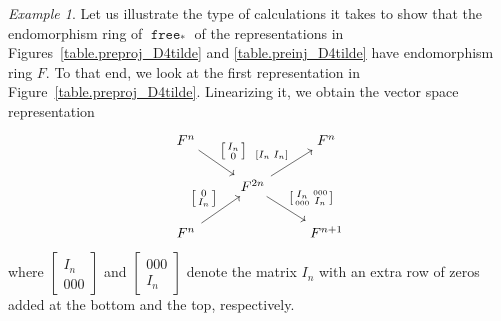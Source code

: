 \documentclass[a4paper]{amsart}
\theoremstyle{plain}
\theoremstyle{definition}
\theoremstyle{remark}
\newtheorem{example}[theorem]{Example}
\newcommand{\funct}[1]{\operatorname{\mathtt{#1}}}
\begin{document}
\begin{example}
\label{ex.D4.preproj.indec}
Let us illustrate the type of calculations it takes to show that the endomorphism ring of \( \funct{free}_* \) of the representations in Figures~\ref{table.preproj_D4tilde} and \ref{table.preinj_D4tilde} have endomorphism ring \( F \). To that end, we look at the first representation in Figure~\ref{table.preproj_D4tilde}. Linearizing it, we obtain the vector space representation
\[ \begin{tikzcd}[ampersand replacement = \&]
F^n \ar[rd, "{\left[ \begin{smallmatrix} I_n \\ 0 \end{smallmatrix} \right]}"] \&\& F^n \\
\& F^{2n} \ar[ru, "{\left[ I_n \; I_n \right]}"] \ar[rd, "{\left[ \begin{smallmatrix} I_n \\ \scriptscriptstyle 000 \end{smallmatrix} \begin{smallmatrix} \scriptscriptstyle 000 \\ I_n \end{smallmatrix} \right]}"] \& \\
F^n \ar[ru, "{\left[ \begin{smallmatrix} 0 \\ I_n \end{smallmatrix} \right]}"] \&\& F^{n+1}
\end{tikzcd} \]
where \( \left[ \begin{smallmatrix} I_n \\ \scriptscriptstyle 000 \end{smallmatrix} \right] \) and \( \left[ \begin{smallmatrix} \scriptscriptstyle 000 \\ I_n \end{smallmatrix} \right] \) denote the matrix \( I_n \) with an extra row of zeros added at the bottom and the top, respectively.


\end{example}
\end{document}
